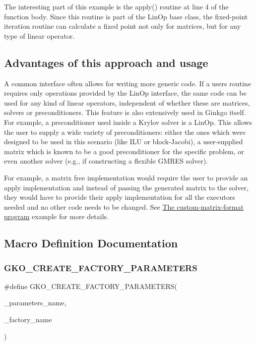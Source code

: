 The interesting part of this example is the apply() routine at line 4 of the function body. Since this routine is part of the Lin\+Op base class, the fixed-\/point iteration routine can calculate a fixed point not only for matrices, but for any type of linear operator.\hypertarget{group__LinOp_linop_3}{}\subsection{Advantages of this approach and usage}\label{group__LinOp_linop_3}
A common interface often allows for writing more generic code. If a user\textquotesingle{}s routine requires only operations provided by the Lin\+Op interface, the same code can be used for any kind of linear operators, independent of whether these are matrices, solvers or preconditioners. This feature is also extensively used in Ginkgo itself. For example, a preconditioner used inside a Krylov solver is a Lin\+Op. This allows the user to supply a wide variety of preconditioners\+: either the ones which were designed to be used in this scenario (like I\+LU or block-\/\+Jacobi), a user-\/supplied matrix which is known to be a good preconditioner for the specific problem, or even another solver (e.\+g., if constructing a flexible G\+M\+R\+ES solver).

For example, a matrix free implementation would require the user to provide an apply implementation and instead of passing the generated matrix to the solver, they would have to provide their apply implementation for all the executors needed and no other code needs to be changed. See \hyperlink{custom_matrix_format}{The custom-\/matrix-\/format program} example for more details. 

\subsection{Macro Definition Documentation}
\mbox{\label{group__LinOp_ga1fc8e9d8be0c9ad2d72bc1ddfc6d8358}} 
\subsubsection{\texorpdfstring{G\+K\+O\+\_\+\+C\+R\+E\+A\+T\+E\+\_\+\+F\+A\+C\+T\+O\+R\+Y\+\_\+\+P\+A\+R\+A\+M\+E\+T\+E\+RS}{GKO\_CREATE\_FACTORY\_PARAMETERS}}
{\footnotesize\ttfamily \#define G\+K\+O\+\_\+\+C\+R\+E\+A\+T\+E\+\_\+\+F\+A\+C\+T\+O\+R\+Y\+\_\+\+P\+A\+R\+A\+M\+E\+T\+E\+RS(\begin{DoxyParamCaption}\item[{}]{\+\_\+parameters\+\_\+name,  }\item[{}]{\+\_\+factory\+\_\+name }\end{DoxyParamCaption})}


